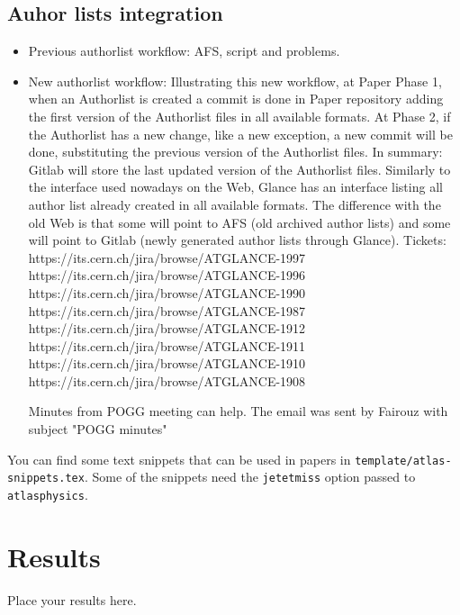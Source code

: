\documentclass[NOTE, atlasdraft=true, texlive=2016, UKenglish]{\ATLASLATEXPATH atlasdoc}
\begin{document}
\subsection{Auhor lists integration}%
\label{sec:auth}
\begin{itemize}
\item Previous authorlist workflow:
AFS, script and problems.

\item New authorlist workflow:
Illustrating this new workflow, at Paper Phase 1, when an Authorlist is created a commit is done in Paper repository adding the first version of the Authorlist files in all available formats. At Phase 2, if the Authorlist has a new change, like a new exception, a new commit will be done, substituting the previous version of the Authorlist files.
In summary: Gitlab will store the last updated version of the Authorlist files.
Similarly to the interface used nowadays on the Web, Glance has an interface listing all author list already created in all available formats. The difference with the old Web is that some will point to AFS (old archived author lists) and some will point to Gitlab (newly generated author lists through Glance).
Tickets:
https://its.cern.ch/jira/browse/ATGLANCE-1997
https://its.cern.ch/jira/browse/ATGLANCE-1996
https://its.cern.ch/jira/browse/ATGLANCE-1990
https://its.cern.ch/jira/browse/ATGLANCE-1987
https://its.cern.ch/jira/browse/ATGLANCE-1912
https://its.cern.ch/jira/browse/ATGLANCE-1911
https://its.cern.ch/jira/browse/ATGLANCE-1910
https://its.cern.ch/jira/browse/ATGLANCE-1908

Minutes from POGG meeting can help. The email was sent by Fairouz with subject "POGG minutes"
\end{itemize}

You can find some text snippets that can be used in papers in \texttt{template/atlas-snippets.tex}.
Some of the snippets need the \texttt{jetetmiss} option passed to \texttt{atlasphysics}.
%


\section{Results}
\label{sec:result}

Place your results here.
\end{document}
